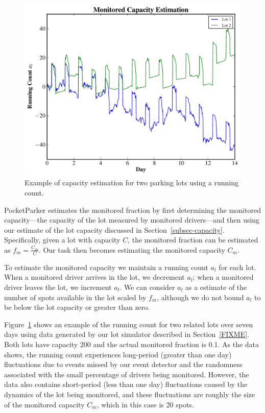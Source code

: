 \begin{figure}
\centering
\includegraphics[width=\columnwidth]{./simulator/figures/capacity.pdf}

\caption{Example of capacity estimation for two parking lots using a running
count.}

\label{fig-capacityexample}
\end{figure}

PocketParker estimates the monitored fraction by first determining the
monitored capacity---the capacity of the lot measured by monitored
drivers---and then using our estimate of the lot capacity discussed in
Section~\ref{subsec-capacity}. Specifically, given a lot with capacity $C$,
the monitored fraction can be estimated as $f_m = \frac{C_m}{C}$. Our task
then becomes estimating the monitored capacity $C_m$.

To estimate the monitored capacity we maintain a running count $a_l$ for each
lot. When a monitored driver arrives in the lot, we decrement $a_l$; when a
monitored driver leaves the lot, we increment $a_l$. We can consider $a_l$ as
a estimate of the number of spots available in the lot scaled by $f_m$,
although we do not bound $a_l$ to be below the lot capacity or greater than
zero.

Figure~\ref{fig-capacityexample} shows an example of the running count for
two related lots over seven days using data generated by our lot simulator
described in Section~\ref{FIXME}. Both lots have capacity 200 and the actual
monitored fraction is 0.1. As the data shows, the running count experiences
long-period (greater than one day) fluctuations due to events missed by our
event detector and the randomness associated with the small percentage of
drivers being monitored. However, the data also contains short-period (less
than one day) fluctuations caused by the dynamics of the lot being monitored,
and these fluctuations are roughly the size of the monitored capacity $C_m$,
which in this case is 20 spots.

